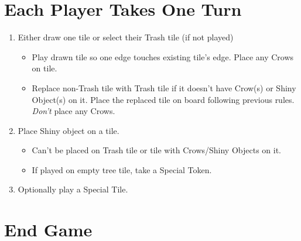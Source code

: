 \documentclass[12pt]{article}
\newenvironment{enumerateCustom}
{\begin{enumerate}
  \setlength{\itemsep}{1pt}
  \setlength{\parskip}{0pt}
  \setlength{\parsep}{0pt}}
{\end{enumerate}}
\newenvironment{itemizeCustom}
{\begin{itemize}
  \setlength{\itemsep}{1pt}
  \setlength{\parskip}{0pt}
  \setlength{\parsep}{0pt}}
{\end{itemize}}
\begin{document}
\begin{mdframed}[style = customFrame]
\begin{multicols*}{2}
\section*{Each Player Takes One Turn}
\begin{enumerateCustom}
	\item Either draw one tile or select their Trash tile (if not played)
		\begin{itemizeCustom}
			\item Play drawn tile so one edge touches existing tile's edge. Place any Crows on tile.
			\item Replace non-Trash tile with Trash tile if it doesn't have Crow(s) or Shiny Object(s) on it. Place the replaced tile on board following previous rules. \emph{Don't} place any Crows.
		\end{itemizeCustom}
	\item Place Shiny object on a tile.
		\begin{itemizeCustom}
			\item Can't be placed on Trash tile or tile with Crows/Shiny Objects on it.
			\item If played on empty tree tile, take a Special Token.
		\end{itemizeCustom}
	\item Optionally play a Special Tile.
\end{enumerateCustom}

\section*{End Game}

\end{multicols*}
\end{mdframed}
\end{document}
